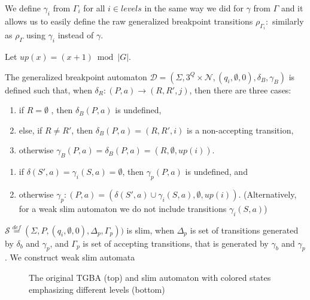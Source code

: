 \documentclass[
	digital,
nolof, nolot
]{fithesis3}
\newcommand{\cD}{\mathcal{D}}
\newcommand{\cN}{\mathcal{N}}
\newcommand{\cS}{\mathcal{S}}
\newcommand{\eqdef}{\overset{def}{=}}
\begin{document}
			We define $\gamma_i$ from $\Gamma_i$ for all $i \in levels$ in the same way we did for $\gamma$ from $\Gamma$ and it allows us to easily define the raw generalized breakpoint transitions
			$\rho_{\Gamma_{i}}\colon$ similarly as $\rho_\Gamma$ using $\gamma_i$ instead of $\gamma$.
			
			Let $up(x)=(x+1)\bmod|G|$.
			
			The generalized breakpoint automaton $\cD=(\Sigma, 3^Q\times\cN, ({q_i},\emptyset, 0),\delta_B,\gamma_B)$ is defined such that, when $\delta_R\colon(P, a) \rightarrow (R, R', j)$, then there are three cases:
			
			
			
			\begin{enumerate}
				\item if $R=\emptyset$ , then $\delta_B(P,a)$ is undefined,
				\item else, if $R \neq R'$, then $\delta_B(P,a) = (R,R',i)$ is a non-accepting transition,
				\item otherwise $\gamma_B(P, a) = \delta_B(P,a) = (R, \emptyset, up(i))$.
			\end{enumerate}
		
		
			\begin{enumerate}
				\item if $\delta(S',a)=\gamma_{i}(S, a)=\emptyset$, then $ \gamma_{p}(P,a)$ is undefined, and
				\item otherwise $\gamma_p \colon (P,a) = (\delta(S',a)\cup \gamma_{i}(S, a), \emptyset, up(i))$. (Alternatively, for a weak slim automaton we do not include transitions $\gamma_{i}(S, a)$)
			\end{enumerate}
			$\cS\eqdef(\Sigma, P, (q_i,\emptyset,0), \Delta_p,\Gamma_p))$ is slim, when $\Delta_p$ is set of transitions generated by $\delta_b$ and $\gamma_p$, and $\Gamma_p$ is set of accepting transitions, that is generated by $\gamma_b$ and $\gamma_p$. We construct weak slim automata 
			
						
			\begin{figure}[ht]
				\begin{center}
					
					
				\end{center}
				\caption{The original TGBA (top) and slim automaton with colored states emphasizing different levels (bottom)  }
				\label{fig:slim:gg}
			\end{figure}
			
\end{document}
